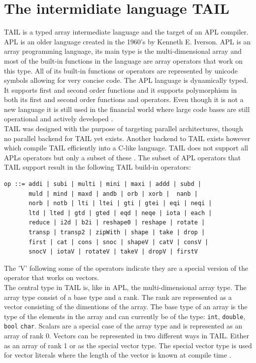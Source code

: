 \documentclass[11pt]{article}
\begin{document}
\section{The intermidiate language TAIL}

TAIL is a typed array intermediate language and the target of an APL compiler.
APL is an older language created in the 1960's by Kenneth E. Iverson.
APL is an array programming language, its main type is the multi-dimensional array 
and most of the built-in functions in the language are array operators that work on this type. 
All of its built-in functions or operators are represented by unicode symbols allowing for very concise code.
The APL language is dynamically typed. It supports first and second order functions and it supports polymorphism in 
both its first and second order functions and operators. 
Even though it is not a new language it is still used in the financial world 
where large code bases are still operational and actively developed \cite{ElsmanDybdal:Array:2014}. \\



TAIL was designed with the purpose of targeting parallel architectures, though no parallel backend for TAIL yet exists.
Another backend to TAIL exists however which compile TAIL efficiently into a C-like language. TAIL does not support
 all APLs operators but only a subset of these \cite{ElsmanDybdal:Array:2014}. 
The subset of APL operators that TAIL support result in the following TAIL build-in operators:

\begin{lstlisting}[numbers=none,frame=none]
op ::= addi | subi | multi | mini | maxi | addd | subd | 
       muld | mind | maxd | andb | orb | xorb |  nanb | 
       norb | notb | lti | ltei | gti | gtei | eqi | neqi |
       ltd | lted | gtd | gted | eqd | neqe | iota | each |
       reduce | i2d | b2i | reshape0 | reshape | rotate |
       transp | transp2 | zipWith | shape | take | drop |
       first | cat | cons | snoc | shapeV | catV | consV | 
       snocV | iotaV | rotateV | takeV | dropV | firstV 
\end{lstlisting}

The 'V' following some of the operators indicate they are a special version of the operator that works on vectors. \\

The central type in TAIL is, like in APL, the multi-dimensional array type. The array type consist of a base type and a rank. The rank are represented as a vector consisting of the dimentions of the array.
The base type of an array is the type of the elements in the array and can currently be of the
type: {\tt int}, {\tt double}, {\tt bool} {\tt char}. 
Scalars are a special case of the array type and is represented as an array of rank 0.
Vectors can be represented in two different ways in TAIL.
Either as an array of rank 1 or as the special vector type.
The special vector type is used for vector literals where the length of the vector is known at compile time \cite{ElsmanDybdal:Array:2014}. \\
\end{document}
